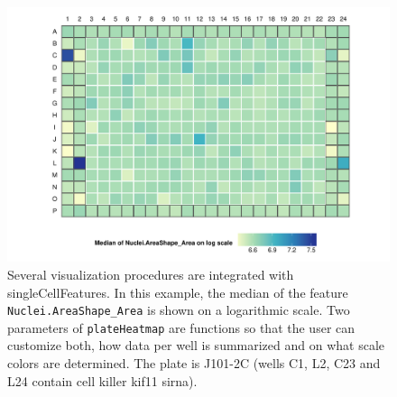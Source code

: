 \begin{knitrout}
\color{fgcolor}\begin{figure}

{\centering \includegraphics[width=.95\linewidth]{figures/R/heatmap-demo-scf-heatmap-1} 

}

\caption[An example heatmap plot as produced by \texttt{plateHeatmap}.]{Several visualization procedures are integrated with singleCellFeatures. In this example, the median of the feature \texttt{Nuclei.AreaShape_Area} is shown on a logarithmic scale. Two parameters of \texttt{plateHeatmap} are functions so that the user can customize both, how data per well is summarized and on what scale colors are determined. The plate is J101-2C (wells C1, L2, C23 and L24 contain cell killer \gls{kif11} \gls{sirna}).}\label{fig:scf-heatmap}
\end{figure}


\end{knitrout}
